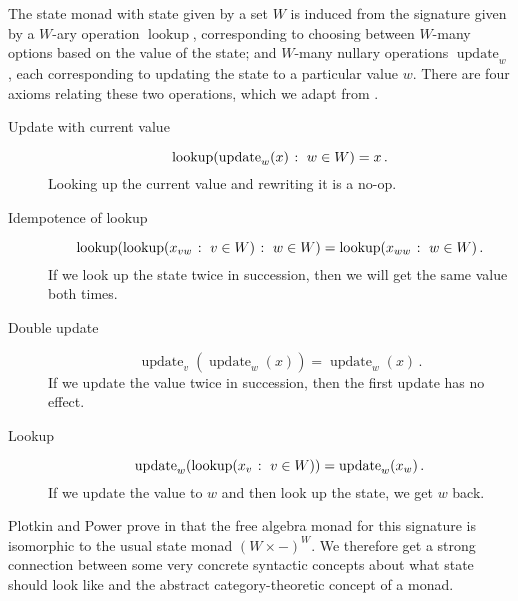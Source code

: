 \documentclass[11pt]{report}
\begin{document}
\newcommand{\lku}{\operatorname{lookup}}
\newcommand{\upd}{\operatorname{update}}

The state monad with state given by a set $W$ is induced from the signature given by a $W$-ary operation $\lku$, corresponding to choosing between $W$-many options based on the value of the state; and $W$-many nullary operations $\upd_w$, each corresponding to updating the state to a particular value $w$.
There are four axioms relating these two operations, which we adapt from \cite{PlotkinPower}.
\begin{description}
	\item[Update with current value] 
          \[
            \lku(\upd_w(x)\suchthat w\in W) = x\,.
            \]
          Looking up the current value and rewriting it is a no-op.
	\item[Idempotence of lookup]
          \[
            \lku(\lku(x_{vw}\suchthat v\in W)\suchthat w\in W)=\lku(x_{ww}\suchthat w\in W)\,.
            \]
          If we look up the state twice in succession, then we will get the same value both times.
	\item[Double update] 
          \[
            \upd_v(\upd_w(x))=\upd_w(x)\,.
            \]
          If we update the value twice in succession, then the first update has no effect.
	\item[Lookup] 
          \[
            \upd_w(\lku(x_v\suchthat v\in W)) = \upd_w(x_w)\,.
            \]
          If we update the value to $w$ and then look up the state, we get $w$ back.
\end{description}

Plotkin and Power prove in \cite{PlotkinPower} that the free algebra monad for this signature is isomorphic to the usual state monad $(W \times -)^W$.
We therefore get a strong connection between some very concrete syntactic concepts about what state should look like and the abstract category-theoretic concept of a monad.



\end{document}

